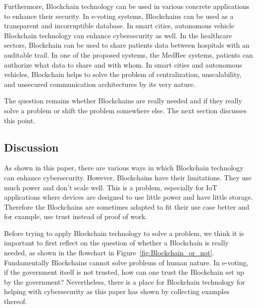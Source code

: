 Furthermore, Blockchain technology can be used in various concrete applications to enhance their security.
In e-voting systems, Blockchains can be used as a transparent and incorruptible database.
In smart cities, autonomous vehicle Blockchain technology can enhance cybersecurity as well.
In the healthcare sectors, Blockchain can be used to share patients data between hospitals with an auditable trail. In one of the proposed systems, the MedRec systems, patients can authorize what data to share and with whom.
In smart cities and autonomous vehicles, Blockchain helps to solve the problem of centralization, unscalability, and unsecured communication architectures by its very nature.

The question remains whether Blockchains are really needed and if they really solve a problem or shift the problem somewhere else. The next section discusses this point.

\subsection{Discussion}

As shown in this paper, there are various ways in which Blockchain technology can enhance cybersecurity.
However, Blockchains have their limitations. They use much power and don't scale well. This is a problem, especially for IoT applications where devices are designed to use little power and have little storage. Therefore the Blockchains are sometimes adapted to fit their use case better and for example, use trust instead of proof of work.

Before trying to apply Blockchain technology to solve a problem, we think it is important to first reflect on the question of whether a Blockchain is really needed, as shown in the flowchart in Figure~\ref{fig:Blockchain_or_not}.
Fundamentally Blockchains cannot solve problems of human nature. In e-voting, if the government itself is not trusted, how can one trust the Blockchain set up by the government? Nevertheless, there is a place for Blockchain technology for helping with cybersecurity as this paper has shown by collecting examples thereof.
